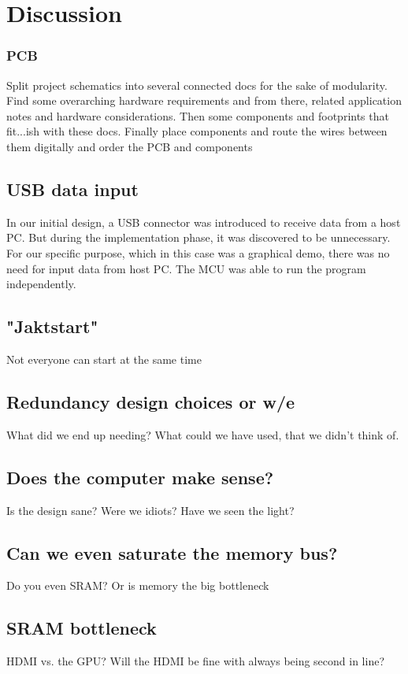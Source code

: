 \documentclass[../main/report.tex]{subfiles}
\begin{document}
\chapter{Discussion}



\subsection{PCB}
Split project schematics into several connected docs for the sake of modularity. Find some overarching hardware requirements and from there, related application notes and hardware considerations. Then some components and footprints that fit...ish with these docs.
Finally place components and route the wires between them digitally and order the PCB and components

\section{USB data input}
In our initial design, a USB connector was introduced to receive data from a host PC. 
But during the implementation phase, it was discovered to be unnecessary.
For our specific purpose, which in this case was a graphical demo, there was no need for input data from host PC. 
The MCU was able to run the program independently.

\section{"Jaktstart"}

Not everyone can start at the same time

\section{Redundancy design choices or w/e}
What did we end up needing?
What could we have used, that we didn't think of.

\section{Does the computer make sense?}
Is the design sane?
Were we idiots?
Have we seen the light?

\section{Can we even saturate the memory bus?}
Do you even SRAM?
Or is memory the big bottleneck

\section{SRAM bottleneck}
HDMI vs. the GPU?
Will the HDMI be fine with always being second in line?
\end{document}
